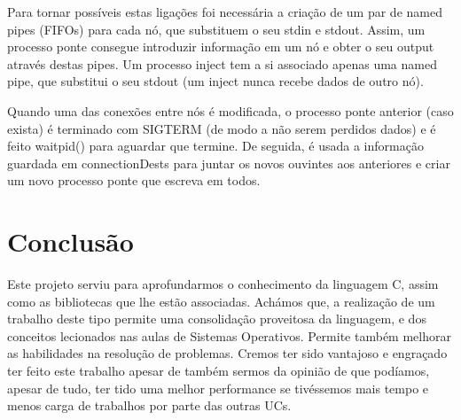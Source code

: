 \documentclass[a4paper]{article}
\begin{document}
 Para tornar possíveis estas ligações foi necessária a criação de um par de named pipes (FIFOs) para cada nó, que substituem o seu stdin e stdout. Assim, um processo ponte consegue introduzir informação em um nó e obter o seu output através destas pipes. Um processo inject tem a si associado apenas uma named pipe, que substitui o seu stdout (um inject nunca recebe dados de outro nó).

 Quando uma das conexões entre nós é modificada, o processo ponte anterior (caso exista) é terminado com SIGTERM (de modo a não serem perdidos dados) e é feito waitpid() para aguardar que termine. De seguida, é usada a informação guardada em connectionDests para juntar os novos ouvintes aos anteriores e criar um novo processo ponte que escreva em todos.

\section{Conclusão}
\label{sec:conclusao}
Este projeto serviu para aprofundarmos o conhecimento da linguagem C, assim como as bibliotecas que lhe estão associadas. Achámos que, a realização de um trabalho deste tipo permite uma consolidação proveitosa da linguagem, e dos conceitos lecionados nas aulas de Sistemas Operativos. Permite também melhorar as habilidades na resolução de problemas. Cremos ter sido vantajoso e engraçado ter feito este trabalho apesar de também sermos da opinião de que podíamos, apesar de tudo, ter tido uma melhor performance se tivéssemos mais tempo e menos carga de trabalhos por parte das outras UCs.
\end{document}
